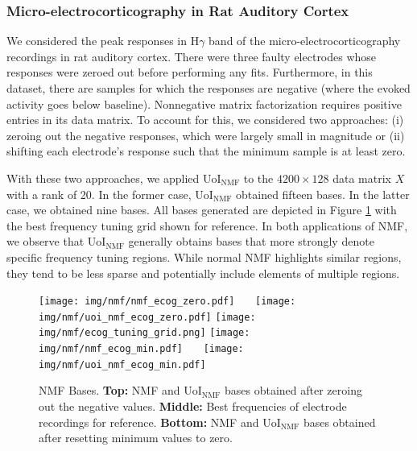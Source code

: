 \documentclass[11pt]{article}
\begin{document}
\subsubsection{Micro-electrocorticography in Rat Auditory Cortex}
We considered the peak responses in H$\gamma$ band of the micro-electrocorticography recordings in rat auditory cortex. There were three faulty electrodes whose responses were zeroed out before performing any fits. Furthermore, in this dataset, there are samples for which the responses are negative (where the evoked activity goes below baseline). Nonnegative matrix factorization requires positive entries in its data matrix. To account for this, we considered two approaches: (i) zeroing out the negative responses, which were largely small in magnitude or (ii) shifting each electrode's response such that the minimum sample is at least zero. 

With these two approaches, we applied UoI$_{\text{NMF}}$ to the $4200\times 128$ data matrix $X$ with a rank of 20. In the former case, UoI$_{\text{NMF}}$ obtained fifteen bases. In the latter case, we obtained nine bases. All bases generated are depicted in Figure \ref{fig:nmf_ecog_bases} with the best frequency tuning grid shown for reference. In both applications of NMF, we observe that UoI$_{\text{NMF}}$ generally obtains bases that more strongly denote specific frequency tuning regions. While normal NMF highlights similar regions, they tend to be less sparse and potentially include elements of multiple regions.

\begin{figure}[t]
	\centering
	\texttt{[image: img/nmf/nmf\_ecog\_zero.pdf]}
	\ \ \ 
	\texttt{[image: img/nmf/uoi\_nmf\_ecog\_zero.pdf]}
	\texttt{[image: img/nmf/ecog\_tuning\_grid.png]}
	\texttt{[image: img/nmf/nmf\_ecog\_min.pdf]}
	\ \ \ 
	\texttt{[image: img/nmf/uoi\_nmf\_ecog\_min.pdf]}
	\caption{NMF Bases. \textbf{Top:} NMF and UoI$_{\text{NMF}}$ bases obtained after zeroing out the negative values. \textbf{Middle:} Best frequencies of electrode recordings for reference. \textbf{Bottom:} NMF and UoI$_{\text{NMF}}$ bases obtained after resetting minimum values to zero.}
	\label{fig:nmf_ecog_bases}
\end{figure}
\end{document}
